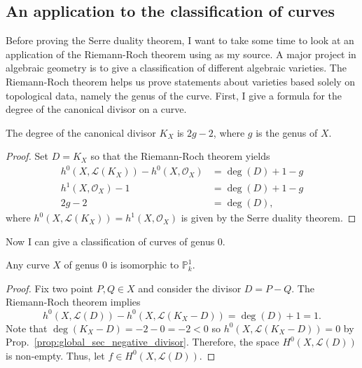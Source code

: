 \subsection{An application to the classification of curves}
Before proving the Serre duality theorem, I want to take some time to
look at an application of the Riemann-Roch theorem using \cite{hartshorne}
as my source. A major project in algebraic geometry is to give a
classification of different algebraic varieties. The Riemann-Roch theorem
helps us prove statements about varieties based solely on topological data,
namely the genus of the curve. First, I give a formula for the degree
of the canonical divisor on a curve.
\begin{lemm}
  The degree of the canonical divisor $K_{X}$ is $2g-2$, where $g$ is the
  genus of $X$.
\end{lemm}
\begin{proof}
  Set $D=K_{X}$ so that the Riemann-Roch theorem yields
  \begin{align*}
    h^{0}(X,\mathcal{L}(K_{X}))-h^{0}(X,\mathscr{O}_{X})&=\deg(D)+1-g \\
    h^{1}(X,\mathscr{O}_{X})-1&=\deg(D)+1-g \\
    2g-2&=\deg(D),
  \end{align*}
  where $h^{0}(X,\mathcal{L}(K_{X}))=h^{1}(X,\mathscr{O}_{X})$ is given
  by the Serre duality theorem.
\end{proof}
Now I can give a classification of curves of genus 0.
\begin{thm}
  Any curve $X$ of genus 0 is isomorphic to $\mathbb{P}^{1}_{k}$.
\end{thm}
\begin{proof}
  Fix two point $P,Q\in X$ and consider the divisor $D=P-Q$. The Riemann-Roch
  theorem implies
  \[
    h^{0}(X,\mathcal{L}(D))-h^{0}(X,\mathcal{L}(K_{X}-D))
    =\deg(D)+1=1.
  \]
  Note that $\deg(K_{X}-D)=-2-0=-2<0$ so $h^{0}(X,\mathcal{L}(K_{X}-D))=0$
  by Prop.~\ref{prop:global_sec_negative_divisor}. Therefore, the space
  $H^{0}(X,\mathcal{L}(D))$ is non-empty. Thus, let
  $f\in H^{0}(X,\mathcal{L}(D))$.
\end{proof}
